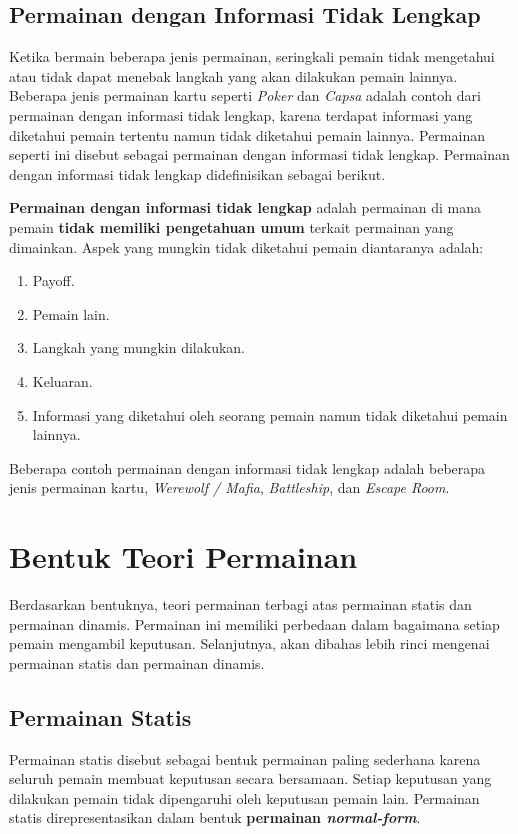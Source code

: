 \subsection{Permainan dengan Informasi Tidak Lengkap}
Ketika bermain beberapa jenis permainan, seringkali pemain tidak mengetahui atau tidak dapat menebak langkah yang akan dilakukan pemain lainnya. Beberapa jenis permainan kartu seperti \textit{Poker} dan \textit{Capsa} adalah contoh dari permainan dengan informasi tidak lengkap, karena terdapat informasi yang diketahui pemain tertentu namun tidak diketahui pemain lainnya. Permainan seperti ini disebut sebagai permainan dengan informasi tidak lengkap. Permainan dengan informasi tidak lengkap didefinisikan sebagai berikut.
\begin{definisi}
    \textbf{Permainan dengan informasi tidak lengkap} adalah permainan di mana pemain \textbf{tidak memiliki pengetahuan umum} terkait permainan yang dimainkan.
    Aspek yang mungkin tidak diketahui pemain diantaranya adalah:
    \begin{enumerate}
        \item Payoff.
        \item Pemain lain.
        \item Langkah yang mungkin dilakukan.
        \item Keluaran.
        \item Informasi yang diketahui oleh seorang pemain namun tidak diketahui pemain lainnya.
    \end{enumerate}
\end{definisi}

Beberapa contoh permainan dengan informasi tidak lengkap adalah beberapa jenis permainan kartu, \textit{Werewolf / Mafia}, \textit{Battleship}, dan \textit{Escape Room}.

\section{Bentuk Teori Permainan}
Berdasarkan bentuknya, teori permainan terbagi atas permainan statis dan permainan dinamis. Permainan ini memiliki perbedaan dalam bagaimana setiap pemain mengambil keputusan. Selanjutnya, akan dibahas lebih rinci mengenai permainan statis dan permainan dinamis.

\subsection{Permainan Statis}
Permainan statis disebut sebagai bentuk permainan paling sederhana karena seluruh pemain membuat keputusan secara bersamaan. Setiap keputusan yang dilakukan pemain tidak dipengaruhi oleh keputusan pemain lain. Permainan statis direpresentasikan dalam bentuk \textbf{permainan \textit{normal-form}}.

